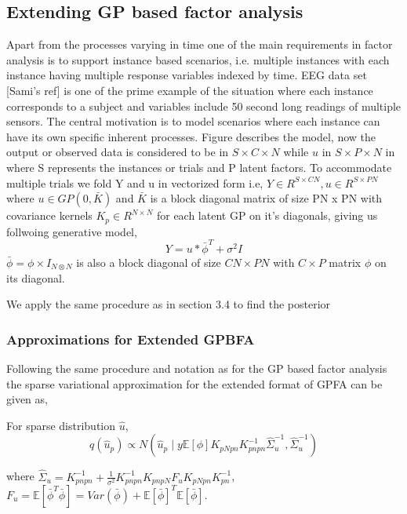 {\subsection{Extending GP based factor analysis}
Apart from the processes varying in time one of the main requirements in factor analysis is to support instance based scenarios, i.e. multiple instances with each instance having multiple response variables indexed by time. EEG data set [Sami's ref] is one of the prime example of the situation where each instance corresponds to a subject and variables include 50 second long readings of multiple sensors. The central motivation is to model scenarios where each instance can have its own specific inherent processes. 
Figure describes the model, now the output or observed data is considered to be in $S \times C \times N$ while $u$ in $S \times P \times N$ in where S represents the instances or trials and P latent factors. 
To accommodate multiple trials we fold Y and u in vectorized form i.e, 
$Y \in R^{S \times CN}, u \in R^{S \times PN }$ where $u \in GP(0,\bar{K})$ and $\bar{K}$ is  a block diagonal matrix of size PN x PN with covariance kernels ${K_p \in R ^{N \times N}}$ for each latent GP on it's diagonals, giving us follwoing generative model,
\begin{equation}
Y= u * \bar{\phi}^T + \sigma^2I
\end{equation}
${  \bar{\phi} = \phi \times I_{N \otimes N} }$ is also a block diagonal of size $CN \times PN$ with $C \times P$ matrix ${\phi}$ on its diagonal.

We apply the same procedure as in section 3.4 to find the posterior 

\subsubsection{ Approximations for Extended GPBFA }
Following the same procedure and notation as for the GP based factor analysis the sparse variational approximation for the extended format of GPFA can be given as,

For sparse distribution ${\hat{u}}$,
$${
q(\hat{u}_p) \propto N(\hat{u}_p \mid y\mathbb{E}[\phi]{K}_{pNpn}K_{pnpn}^{-1}\hat{\Sigma}_{u}^{-1}, \hat{\Sigma}_{u}^{-1})
}$$

where $\hat{\Sigma}_u = K_{pnpn}^{-1} + \frac{1}{\sigma^2}K_{pnpn}^{-1}K_{pnpN}F_uK_{pNpn}K_{pn}^{-1}$, $F_u = \mathbb{E}[{\bar{\phi}}^T{\bar{\phi}}] = Var({\bar{\phi}}) + \mathbb{E}[{\bar{\phi}}]^T\mathbb{E}[{\bar{\phi}}]$.

}
